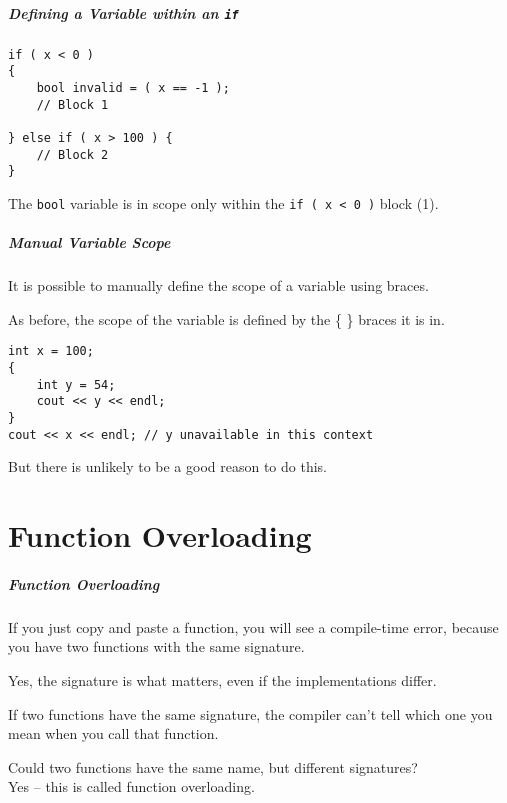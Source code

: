 \begin{frame}[fragile]
\frametitle{Defining a Variable within an \texttt{if}}

\begin{verbatim}
if ( x < 0 )
{
    bool invalid = ( x == -1 );
    // Block 1
    
} else if ( x > 100 ) {
    // Block 2
}
\end{verbatim}

The \texttt{bool} variable is in scope only within the \texttt{if ( x < 0 )} block (1).

\end{frame}

\begin{frame}[fragile]
\frametitle{Manual Variable Scope}
It is possible to manually define the scope of a variable using braces.

As before, the scope of the variable is defined by the \{ \} braces it is in.

\begin{verbatim}
int x = 100;
{
    int y = 54;
    cout << y << endl;
}
cout << x << endl; // y unavailable in this context
\end{verbatim}

But there is unlikely to be a good reason to do this.


\end{frame}

\part{Function Overloading}
\begin{frame}\partpage\end{frame}

\begin{frame}
\frametitle{Function Overloading}
If you just copy and paste a function, you will see a compile-time error, because you have two functions with the same signature.

Yes, the signature is what matters, even if the implementations differ.

If two functions have the same signature, the compiler can't tell which one you mean when you call that function.

Could two functions have the same name, but different signatures?\\
\quad Yes -- this is called \alert{function overloading}.

\end{frame}

